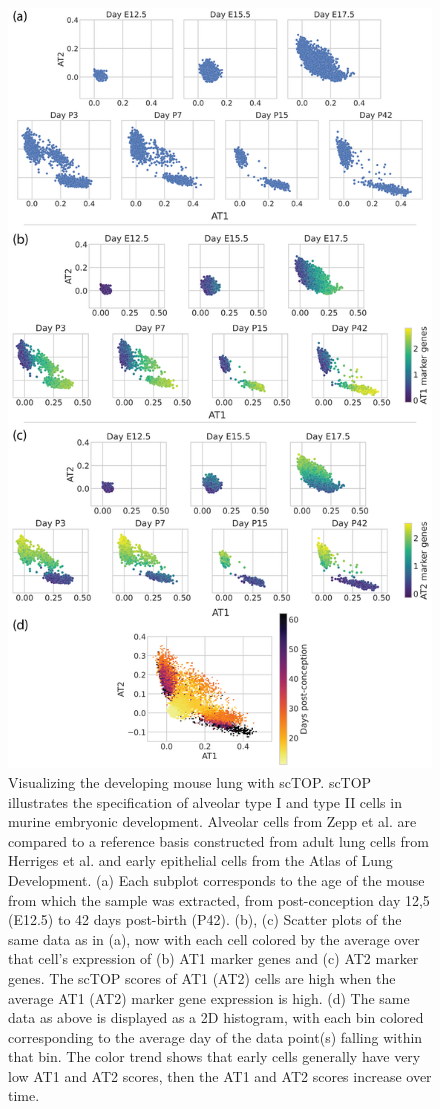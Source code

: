 \documentclass[aps,superscriptaddress, notitlepage,longbibliography]{revtex4-1}
\begin{document}
\begin{figure}
	\centering
		\includegraphics[scale=0.52]{figs/LungMAP.png}
	\caption{Visualizing the developing mouse lung with scTOP. scTOP illustrates the specification of alveolar type I and type II cells in murine embryonic development. Alveolar cells from Zepp et al. are compared to a reference basis constructed from adult lung cells from Herriges et al. and early epithelial cells from the Atlas of Lung Development. (a) Each subplot corresponds to the age of the mouse from which the sample was extracted, from post-conception day 12,5 (E12.5) to 42 days post-birth (P42). (b), (c) Scatter plots of the same data as in (a), now with each cell colored by the average over that cell's expression of (b) AT1 marker genes and (c) AT2 marker genes. The scTOP scores of AT1 (AT2) cells are high when the average AT1 (AT2) marker gene expression is high. (d) The same data as above is displayed as a 2D histogram, with each bin colored corresponding to the average day of the data point(s) falling within that bin. The color trend shows that early cells generally have very low AT1 and AT2 scores, then the AT1 and AT2 scores increase over time.}

\end{figure}
\end{document}
